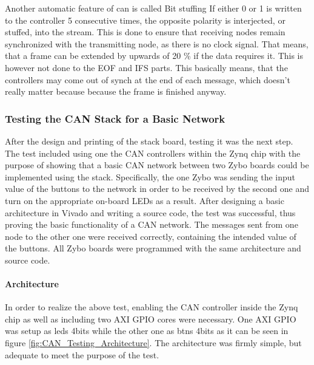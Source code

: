 Another automatic feature of can is called Bit stuffing
If either 0 or 1 is written to the controller 5 consecutive times, the opposite polarity is interjected, or stuffed, into the stream. 
This is done to ensure that receiving nodes remain synchronized with the transmitting node, as there is no clock signal.
That means, that a frame can be extended by upwards of 20 \% if the data requires it.
This is however not done to the EOF and IFS parts.
This basically means, that the controllers may come out of synch at the end of each message, which doesn't really matter because because the frame is finished anyway.


\subsubsection{Testing the CAN Stack for a Basic Network}
\label{sub:TestingCANStack_BareMetal}

After the design and printing of the stack board, testing it was the next step.
The test included using one the CAN controllers within the Zynq chip with the purpose of showing that a basic CAN network between two Zybo boards could be implemented using the stack.
Specifically, the one Zybo was sending the input value of the buttons to the network in order to be received by the second one and turn on the appropriate on-board LEDs as a result.
After designing a basic architecture in Vivado and writing a source code, the test was successful, thus proving the basic functionality of a CAN network.
The messages sent from one node to the other one were received correctly, containing the intended value of the buttons. 
All Zybo boards were programmed with the same architecture and source code.

\paragraph{Architecture}
In order to realize the above test, enabling the CAN controller inside the Zynq chip as well as including two AXI GPIO cores were necessary.
One AXI GPIO was setup as leds 4bits while the other one as btns 4bits as it can be seen in figure \ref{fig:CAN_Testing_Architecture}. The architecture was firmly simple, but adequate to meet the purpose of the test.

